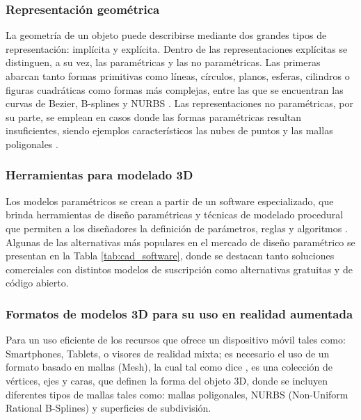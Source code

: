         \subsubsection{Representación geométrica}

            La geometría de un objeto puede describirse mediante dos grandes tipos de representación: implícita y explícita. Dentro de las representaciones explícitas se distinguen, a su vez, las paramétricas y las no paramétricas. Las primeras abarcan tanto formas primitivas como líneas, círculos, planos, esferas, cilindros o figuras cuadráticas como formas más complejas, entre las que se encuentran las curvas de Bezier, B-splines y NURBS \parencite{PATRAUCEAN:2015}. Las representaciones no paramétricas, por su parte, se emplean en casos donde las formas paramétricas resultan insuficientes, siendo ejemplos característicos las nubes de puntos y las mallas poligonales \parencite{PATRAUCEAN:2015, FOUGEROLLE:2005}.

        \subsubsection{Herramientas para modelado 3D}

            Los modelos paramétricos se crean a partir de un software especializado, que brinda herramientas de diseño paramétricas y técnicas de modelado procedural que permiten a los diseñadores la definición de parámetros, reglas y algoritmos \parencite{GHUGE:2023}. Algunas de las alternativas más populares en el mercado de diseño paramétrico se presentan en la Tabla \ref{tab:cad_software}, donde se destacan tanto soluciones comerciales con distintos modelos de suscripción como alternativas gratuitas y de código abierto.

            

        \subsubsection{Formatos de modelos 3D para su uso en realidad aumentada}

            Para un uso eficiente de los recursos que ofrece un dispositivo móvil tales como: Smartphones, Tablets, o visores de realidad mixta; es necesario el uso de un formato basado en mallas (Mesh), la cual tal como dice \textcite{GHUGE:2023}, es una colección de vértices, ejes y caras, que definen la forma del objeto 3D, donde se incluyen diferentes tipos de mallas tales como: mallas poligonales, NURBS (Non-Uniform Rational B-Splines) y superficies de subdivisión.

